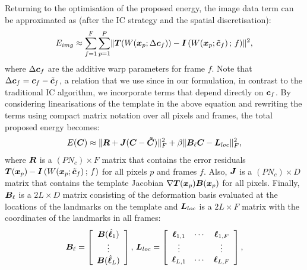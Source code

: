 Returning to the optimisation of the proposed energy, the
image data term can be approximated as (after the IC strategy and the spatial
discretisation):
\begin{equation}
    E_{img} \approx \sum_{f=1}^F \sum_{p=1}^P  \lVert{} 
                                    \boldsymbol{T}(W(\boldsymbol{x}_p;\Delta \boldsymbol{c}_f)) -
                                   \boldsymbol{I}\left( W(\boldsymbol{x}_p;\tilde{\boldsymbol{c}}_f)\,;\, f \right)
                                  \rVert^2,
\end{equation}
where $\Delta \boldsymbol{c}_f$ are the additive warp parameters for frame $f$.
Note that $\Delta \boldsymbol{c}_f = \boldsymbol{c}_f - \tilde{\boldsymbol{c}}_f$, a relation that we use since
in our formulation, in contrast to the traditional IC algorithm, we incorporate
terms that depend directly on $\boldsymbol{c}_f$.
By considering linearisations of the template in the above equation and rewriting
the terms using compact matrix notation over all pixels and frames, the total
proposed energy becomes:
\begin{equation}\label{E:ENERGY}
    E(\boldsymbol{C}) \approx \lVert{}  \boldsymbol{R} + \boldsymbol{J} (\boldsymbol{C} - \boldsymbol{\tilde{C}})  \rVert_F^2
    + \beta \lVert{} \boldsymbol{B}_\ell \boldsymbol{C} - \boldsymbol{L}_{loc} \rVert_F^2,
\end{equation}
where $\boldsymbol{R}$ is a $(P N_c) \times F$ matrix that contains the error residuals
$\boldsymbol{T}(\boldsymbol{x}_p) - \boldsymbol{I}\left( W(\boldsymbol{x}_p;\tilde{\boldsymbol{c}}_f) \,;\, f \right)$ for all pixels
$p$ and frames $f$. Also,
$\boldsymbol{J}$ is a $(P N_c) \times D$ matrix that contains the template Jacobian
$\nabla\boldsymbol{T}(\boldsymbol{x}_p) \boldsymbol{B}(\boldsymbol{x}_p)$ for all pixels.
Finally, $\boldsymbol{B}_\ell$ is a $2L \times D$ matrix consisting of the deformation
basis evaluated at the locations of the landmarks on the template and
$\boldsymbol{L}_{loc}$ is a $2L\times F$ matrix with the coordinates of the landmarks
in all frames:
\begin{equation}
    \boldsymbol{B}_\ell=
        \left[
            \begin{array}{c}
                \boldsymbol{B}(\hat{\boldsymbol{\ell}}_1) \\
                \vdots \\
                \boldsymbol{B}(\hat{\boldsymbol{\ell}}_L)
            \end{array}
        \right],\,
    \boldsymbol{L}_{loc}=
        \left[
            \begin{array}{ccc}
                \boldsymbol{\ell}_{1,1}&\cdots&\boldsymbol{\ell}_{1,F}
                \\
                \vdots&&\vdots
                \\
                \boldsymbol{\ell}_{L,1}&\cdots&\boldsymbol{\ell}_{L,F}
            \end{array}
        \right],
\end{equation}


